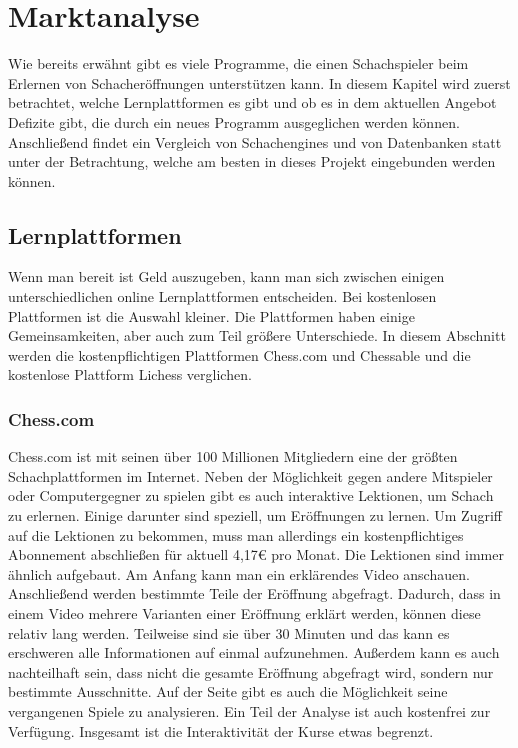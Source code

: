 
\chapter{Marktanalyse}
Wie bereits erwähnt gibt es viele Programme, die einen Schachspieler beim Erlernen von Schacheröffnungen unterstützen kann. In diesem Kapitel wird zuerst betrachtet, welche Lernplattformen es gibt und ob es in dem aktuellen Angebot Defizite gibt, die durch ein neues Programm ausgeglichen werden können. Anschließend findet ein Vergleich von Schachengines und von Datenbanken statt unter der Betrachtung, welche am besten in dieses Projekt eingebunden werden können.


\section{Lernplattformen}
Wenn man bereit ist Geld auszugeben, kann man sich zwischen einigen unterschiedlichen online Lernplattformen entscheiden. Bei kostenlosen Plattformen ist die Auswahl kleiner. Die Plattformen haben einige Gemeinsamkeiten, aber auch zum Teil größere Unterschiede. In diesem Abschnitt werden die kostenpflichtigen Plattformen Chess.com und Chessable und die kostenlose Plattform Lichess verglichen.

\subsection{Chess.com}
Chess.com ist mit seinen über 100 Millionen Mitgliedern eine der größten Schachplattformen im Internet. \cite{chesscom_chesscom_2022} Neben der Möglichkeit gegen andere Mitspieler oder Computergegner zu spielen gibt es auch interaktive Lektionen, um Schach zu erlernen. Einige darunter sind speziell, um Eröffnungen zu lernen. Um Zugriff auf die Lektionen zu bekommen, muss man allerdings ein kostenpflichtiges Abonnement abschließen für aktuell 4,17€ pro Monat. Die Lektionen sind immer ähnlich aufgebaut. Am Anfang kann man ein erklärendes Video anschauen. Anschließend werden bestimmte Teile der Eröffnung abgefragt. Dadurch, dass in einem Video mehrere Varianten einer Eröffnung erklärt werden, können diese relativ lang werden. Teilweise sind sie über 30 Minuten und das kann es erschweren alle Informationen auf einmal aufzunehmen. Außerdem kann es auch nachteilhaft sein, dass nicht die gesamte Eröffnung abgefragt wird, sondern nur bestimmte Ausschnitte. Auf der Seite gibt es auch die Möglichkeit seine vergangenen Spiele zu analysieren. Ein Teil der Analyse ist auch kostenfrei zur Verfügung. Insgesamt ist die Interaktivität der Kurse etwas begrenzt.

